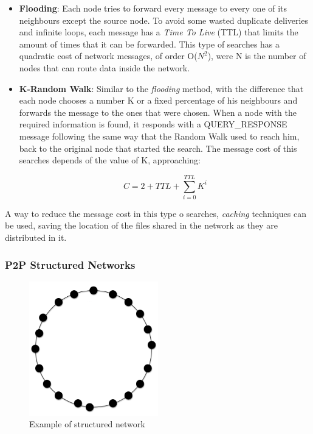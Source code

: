 \begin{itemize}
    \item \textbf{Flooding}: 
Each node tries to forward every message to every one of its neighbours except
the source node. To avoid some wasted duplicate deliveries and infinite loops,
each message has a \textit{Time To Live} (TTL) that limits the amount of times
that it can be forwarded. This type of searches has a quadratic cost of network
messages, of order O($N^2$), were N is the number of nodes that can route data
inside the network.
    \item \textbf{K-Random Walk}: Similar to the \textit{flooding} method, with
the difference that each node chooses a number K or a fixed percentage of his
neighbours and forwards the message to the ones that were chosen. When a node
with the required information is found, it responds with a QUERY\_RESPONSE
message following the same way that the Random Walk used to reach him, back to
the original node that started the search. The message cost of this searches
depends of the value of K, approaching:

\begin{equation}
\label{eq:krandomwalk}
 C = 2 + TTL +
\sum_{i=0}^{TTL} K^i
\end{equation}

\end{itemize}

A way to reduce the message cost in this type o searches, \textit{caching}
techniques can be used, saving the location of the files shared in the network
as they are distributed in it.

\subsubsection{P2P Structured Networks}
\label{sec:p2p_estructured}

\begin{figure}
\center
\includegraphics[width=0.5\textwidth]{img/p2p-structured}
\caption{Example of structured network}
\label{fig:p2p_estructured}
\end{figure}


